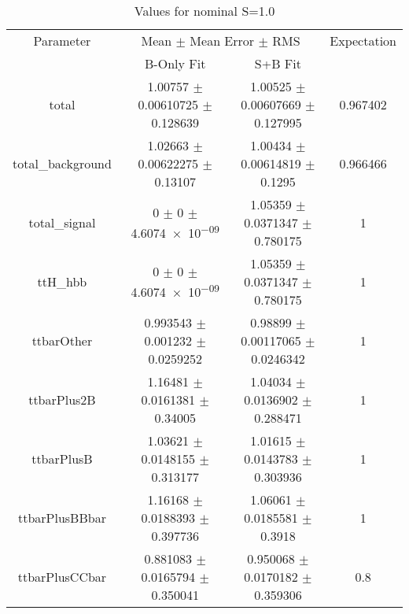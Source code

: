 \begin{table}
\centering
\caption{Values for nominal S=1.0}
\begin{tabular}{cccc}
\toprule
Parameter & \multicolumn{2}{c}{Mean $\pm$ Mean Error $\pm$ RMS} & Expectation\\
 & B-Only Fit & S+B Fit & \\
\midrule
total & \num{1.00757} $\pm$ \num{0.00610725} $\pm$ \num{0.128639} & \num{1.00525} $\pm$ \num{0.00607669} $\pm$ \num{0.127995} & \num{0.967402}\\
total\_background & \num{1.02663} $\pm$ \num{0.00622275} $\pm$ \num{0.13107} & \num{1.00434} $\pm$ \num{0.00614819} $\pm$ \num{0.1295} & \num{0.966466}\\
total\_signal & \num{0} $\pm$ \num{0} $\pm$ \num{4.6074e-09} & \num{1.05359} $\pm$ \num{0.0371347} $\pm$ \num{0.780175} & \num{1}\\
ttH\_hbb & \num{0} $\pm$ \num{0} $\pm$ \num{4.6074e-09} & \num{1.05359} $\pm$ \num{0.0371347} $\pm$ \num{0.780175} & \num{1}\\
ttbarOther & \num{0.993543} $\pm$ \num{0.001232} $\pm$ \num{0.0259252} & \num{0.98899} $\pm$ \num{0.00117065} $\pm$ \num{0.0246342} & \num{1}\\
ttbarPlus2B & \num{1.16481} $\pm$ \num{0.0161381} $\pm$ \num{0.34005} & \num{1.04034} $\pm$ \num{0.0136902} $\pm$ \num{0.288471} & \num{1}\\
ttbarPlusB & \num{1.03621} $\pm$ \num{0.0148155} $\pm$ \num{0.313177} & \num{1.01615} $\pm$ \num{0.0143783} $\pm$ \num{0.303936} & \num{1}\\
ttbarPlusBBbar & \num{1.16168} $\pm$ \num{0.0188393} $\pm$ \num{0.397736} & \num{1.06061} $\pm$ \num{0.0185581} $\pm$ \num{0.3918} & \num{1}\\
ttbarPlusCCbar & \num{0.881083} $\pm$ \num{0.0165794} $\pm$ \num{0.350041} & \num{0.950068} $\pm$ \num{0.0170182} $\pm$ \num{0.359306} & \num{0.8}\\
\bottomrule
\end{tabular}
\end{table}